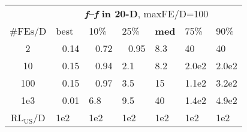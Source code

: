 \begin{tabular}{c|llllll}
 & \multicolumn{6}{|c}{\textbf{\textit{f}\raisebox{-0.35ex}{1}--\textit{f}\raisebox{-0.35ex}{24} in 20-D}, maxFE/D=100}\\
\#FEs/D & best & 10\% & 25\% & \textbf{med} & 75\% & 90\%\\
2 & ~\,0.14 & ~\,0.72 & ~\,0.95 & \hspace*{1ex}8.3 & 40 & 40\\
10 & ~\,0.15 & ~\,0.94 & \hspace*{1ex}2.1 & \hspace*{1ex}8.2 & 2.0e2 & 2.0e2\\
100 & ~\,0.15 & ~\,0.97 & \hspace*{1ex}3.5 & 15 & 1.1e2 & 3.2e2\\
1e3 & ~\,0.01 & \hspace*{1ex}6.8 & \hspace*{1ex}9.5 & 40 & 1.4e2 & 4.9e2\\
$\text{RL}_{\text{US}}$/D & 1e2 & 1e2 & 1e2 & 1e2 & 1e2 & 1e2
\end{tabular}
